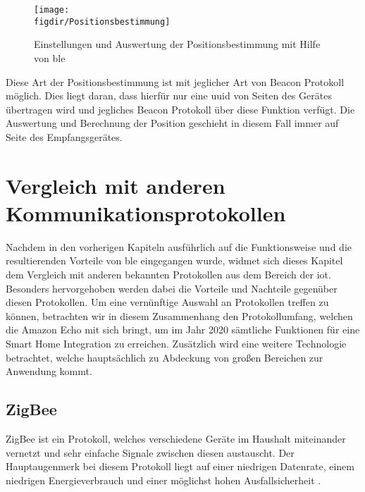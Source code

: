 \begin{figure}[hbtp]
	\centering
	\texttt{[image: \\figdir/Positionsbestimmung]}
	\caption{Einstellungen und Auswertung der Positionsbestimmung mit Hilfe von \ac{ble} \cite{BKS:WWW}}
	\label{FIG:poition}
\end{figure} 

\noindent Diese Art der Positionsbestimmung ist mit jeglicher Art von Beacon Protokoll möglich. Dies liegt daran, dass hierfür nur eine \ac{uuid} von Seiten des Gerätes übertragen wird und jegliches Beacon Protokoll über diese Funktion verfügt. Die Auswertung und Berechnung der Position geschieht in diesem Fall immer auf Seite des Empfangsgerätes.\\ 

\section{Vergleich mit anderen Kommunikationsprotokollen}
\label{s:vergleich}

Nachdem in den vorherigen Kapiteln ausführlich auf die Funktionsweise und die resultierenden Vorteile von \ac{ble} eingegangen wurde, widmet sich dieses Kapitel dem Vergleich mit anderen bekannten Protokollen aus dem Bereich der \ac{iot}. Besonders hervorgehoben werden dabei die Vorteile und Nachteile gegenüber diesen Protokollen. Um eine vernünftige Auswahl an Protokollen treffen zu können, betrachten wir in diesem Zusammenhang den Protokollumfang, welchen die Amazon Echo mit sich bringt, um im Jahr 2020 sämtliche Funktionen für eine Smart Home Integration zu erreichen. Zusätzlich wird eine weitere Technologie betrachtet, welche hauptsächlich zu Abdeckung von großen Bereichen zur Anwendung kommt.\\  

\subsection{ZigBee}
\label{ss:vergleich:zigbee}

ZigBee ist ein Protokoll, welches verschiedene Geräte im Haushalt miteinander vernetzt und sehr einfache Signale zwischen diesen austauscht. Der Hauptaugenmerk bei diesem Protokoll liegt auf einer niedrigen Datenrate, einem niedrigen Energieverbrauch und einer möglichst hohen Ausfallsicherheit \cite[Seite 195]{Gessler14:WNN}.\\ 

